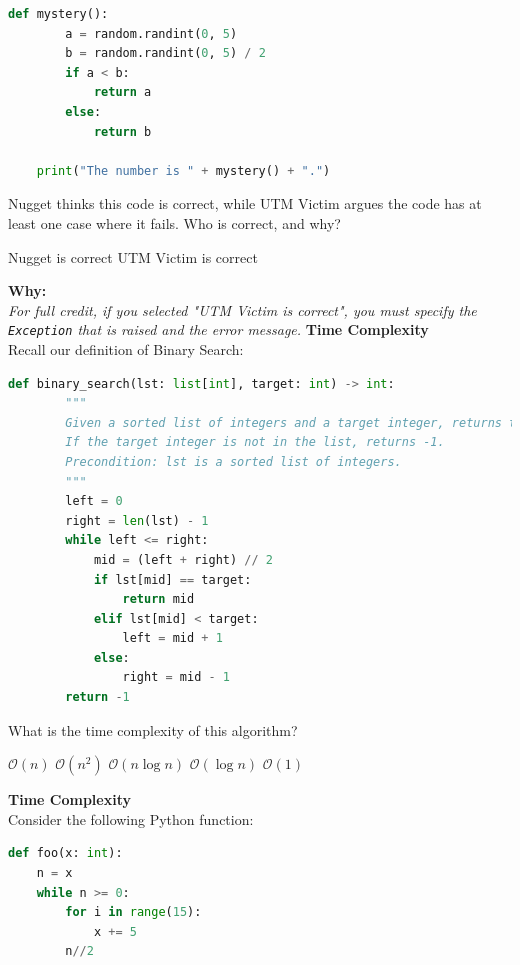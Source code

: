\documentclass[letterpaper,13pt,addpoints]{exam}
\begin{document}
\begin{questions}
\begin{lstlisting}[language=Python, style=mystyle]
    def mystery():
        a = random.randint(0, 5)
        b = random.randint(0, 5) / 2
        if a < b:
            return a
        else:
            return b

    print("The number is " + mystery() + ".")
    \end{lstlisting}
    Nugget thinks this code is correct, while UTM Victim argues the code has at
    least one case where it fails. Who is correct, and why?
    \begin{choices}
        \choice Nugget is correct
        \choice UTM Victim is correct
    \end{choices}
    \textbf{Why:} \underline{\hspace{15cm}} \\
    \textit{For full credit, if you selected "UTM Victim is correct", you must specify the \texttt{Exception} that is raised and the error message.} \underline{\hspace{10cm}}
    \pagebreak
    \question[5] \textbf{Time Complexity} \\
    Recall our definition of Binary Search:
    \begin{lstlisting}[language=Python, style=mystyle]
    def binary_search(lst: list[int], target: int) -> int:
        """
        Given a sorted list of integers and a target integer, returns the index of the target integer in the list.
        If the target integer is not in the list, returns -1.
        Precondition: lst is a sorted list of integers.
        """
        left = 0
        right = len(lst) - 1
        while left <= right:
            mid = (left + right) // 2
            if lst[mid] == target:
                return mid
            elif lst[mid] < target:
                left = mid + 1
            else:
                right = mid - 1
        return -1
    \end{lstlisting}
    What is the time complexity of this algorithm?
    \begin{choices}
        \choice $\mathcal{O}(n)$
        \choice $\mathcal{O}(n^2)$
        \choice $\mathcal{O}(n\log n)$
        \choice $\mathcal{O}(\log n)$
        \choice $\mathcal{O}(1)$
    \end{choices}
    \question[5] \textbf{Time Complexity} \\
    Consider the following Python function:
    \begin{lstlisting}[language=Python, style=mystyle]
def foo(x: int):
    n = x
    while n >= 0:
        for i in range(15):
            x += 5
        n//2
    \end{lstlisting}

\end{questions}
\end{document}
